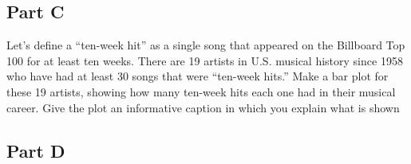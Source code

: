 \documentclass[
]{article}
\begin{document}
\hypertarget{part-c}{%
\subsection{Part C}\label{part-c}}

Let's define a ``ten-week hit'' as a single song that appeared on the
Billboard Top 100 for at least ten weeks. There are 19 artists in U.S.
musical history since 1958 who have had at least 30 songs that were
``ten-week hits.'' Make a bar plot for these 19 artists, showing how
many ten-week hits each one had in their musical career. Give the plot
an informative caption in which you explain what is shown

\hypertarget{part-d}{%
\subsection{Part D}\label{part-d}}
\end{document}
